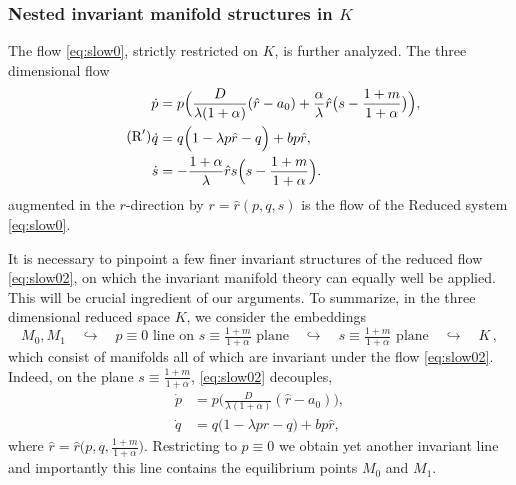 \documentclass[usletter,11pt]{article}
\theoremstyle{remark}
\begin{document}
\subsubsection{Nested invariant manifold structures in $K$}
The flow \eqref{eq:slow0}, strictly restricted on $K$, is further analyzed. The three dimensional flow
\begin{equation}\label{eq:slow02} \tag{$\text{R}^\prime$}
 \begin{aligned}
 \dot{p} &= p\Big(\frac{D}{\lambda(1+\alpha)}(\hat{r}-a_0) + \frac{\alpha}{\lambda}\hat{r}\big(s- \frac{1+m}{1+\alpha}\big) \Big),\\
 \dot{q} &=q\Big(1 -\lambda p \hat{r} -q\Big) + b p \hat{r},\\%
 \dot{s} &= -\frac{1+\alpha}{\lambda}\hat{r}s\Big(s- \frac{1+m}{1+\alpha}\Big).
 \end{aligned}
\end{equation}
augmented in the $r$-direction by $r=\hat{r}(p,q,s)$ is the flow of the Reduced system \eqref{eq:slow0}. 

It is necessary to pinpoint a few finer invariant structures of the reduced flow \eqref{eq:slow02}, on which the invariant manifold theory can  equally well be applied.  This will be crucial ingredient of our arguments. To summarize, in the three dimensional reduced space $K$, we 
consider the embeddings 
$$ 
M_0, M_1 \quad \hookrightarrow \quad \text{$p\equiv0$ line on $s\equiv\tfrac{1+m}{1+\alpha}$ plane} \quad \hookrightarrow \quad \text{$s\equiv\tfrac{1+m}{1+\alpha}$ plane} \quad \hookrightarrow \quad K \, ,
$$
which consist of manifolds all of which are invariant under the flow \eqref{eq:slow02}. Indeed, on the plane $s\equiv\tfrac{1+m}{1+\alpha}$, \eqref{eq:slow02} decouples,
\begin{equation}\label{eq:slow03}
 \begin{aligned}
 \dot{p} &= p\Big(\frac{D}{\lambda(1+\alpha)}(\hat{r}-a_0)\Big),\\
 \dot{q} &= q\Big(1 -\lambda p \hat{r} -q\Big) + b p \hat{r}, 
 \end{aligned}
\end{equation}
where $\hat{r}=\hat{r}\big(p,q,\frac{1+m}{1+\alpha}\big)$. Restricting to $p\equiv0$ we obtain yet another invariant line and importantly this line contains 
the equilibrium points $M_0$ and $M_1$.
\end{document}

